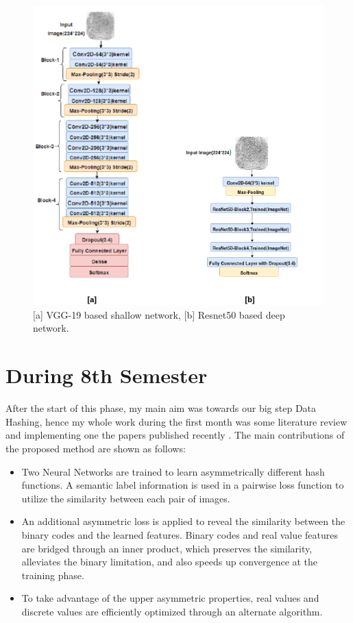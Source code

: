 \begin{figure}[htbp]
\centering
\includegraphics[scale=0.8]{./Chapter3/Figures/ModelDiagram}
\caption{ [a] VGG-19 based shallow network, [b] Resnet50 based deep network.
}\label{fig:figure2}
\end{figure}


\section{During 8th Semester}
After the start of this phase, my main aim was towards our big step Data Hashing, hence my whole work during the first month was some literature review and implementing one the papers published recently \cite{Li2018DualAD}.
The main contributions of the proposed method are shown as follows:
\begin{itemize}
	\item Two Neural Networks are trained to learn asymmetrically different hash functions. A semantic label information is used in a pairwise loss function to utilize the similarity between each pair of images.
	\item An additional asymmetric loss is applied to reveal the similarity between the binary codes and the learned features. Binary codes and real value features are bridged through an inner product, which preserves the similarity, alleviates the binary limitation, and also speeds up convergence at the training phase.
	\item To take advantage of the upper asymmetric properties, real values and discrete values are efficiently optimized through an alternate algorithm.
\end{itemize}
